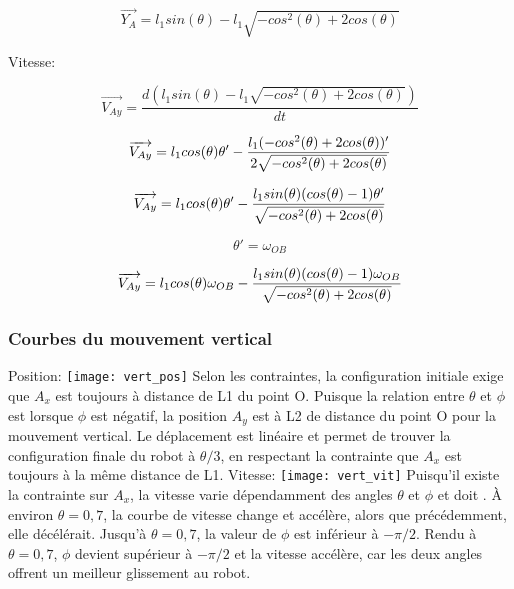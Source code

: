 \documentclass{article}
\begin{document}
\begin{equation}
\overrightarrow{Y_A} = l_1sin(\theta)-l_1\sqrt{-cos^2(\theta)+2cos(\theta)}
\end{equation}

\noindent Vitesse:

\begin{equation}
\overrightarrow{V_{Ay}} = \frac{d(l_1sin(\theta)-l_1\sqrt{-cos^2(\theta)+2cos(\theta)})}{dt}
\end{equation}

\begin{equation}
\overrightarrow{V_{Ay}} = l_1cos(\theta)\theta'-\\
\frac{l_1(-cos^2(\theta)+2cos(\theta))'}{2\sqrt{-cos^2(\theta)+2cos(\theta)}}
\end{equation}

\begin{equation}
\overrightarrow{V_{Ay}} = l_1cos(\theta)\theta'-\\
\frac{l_1sin(\theta)(cos(\theta)-1)\theta'}{\sqrt{-cos^2(\theta)+2cos(\theta)}}
\end{equation}

\begin{equation}
\theta' = \omega_{OB}
\end{equation}

\begin{equation}
\overrightarrow{V_{Ay}} = l_1cos(\theta)\omega_{OB}-\\
\frac{l_1sin(\theta)(cos(\theta)-1)\omega_{OB}}{\sqrt{-cos^2(\theta)+2cos(\theta)}}
\end{equation}

\subsubsection{Courbes du mouvement vertical}
Position:
\newline
\noindent \texttt{[image: vert\_pos]}
Selon les contraintes, la configuration initiale exige que $A_x$ est toujours à distance de L1 du point O. Puisque la relation entre $\theta$ et $\phi$ est lorsque $\phi$ est négatif, la position $A_y$ est à L2 de distance du point O pour la mouvement vertical. Le déplacement est linéaire et permet de trouver la configuration finale du robot à $\theta/3$, en respectant la contrainte que $A_x$ est toujours à la même distance de L1.
\newline
\newline
\noindent Vitesse:
\newline
\noindent \texttt{[image: vert\_vit]}
Puisqu'il existe la contrainte sur $A_x$, la vitesse varie dépendamment des angles $\theta$ et $\phi$ et doit . À environ $\theta = 0,7$, la courbe de vitesse change et accélère, alors que précédemment, elle décélérait. Jusqu'à $\theta = 0,7$, la valeur de $\phi$ est inférieur à $-\pi/2$. Rendu à $\theta = 0,7$, $\phi$ devient supérieur à $-\pi/2$ et la vitesse accélère, car les deux angles offrent un meilleur glissement au robot.
\end{document}
